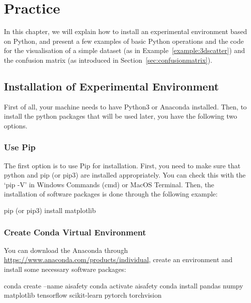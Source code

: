 \newpage 
\chapter{Practice}\label{sec:foundationspracticals}

In this chapter, we will explain how to install an experimental environment based on Python, and present a few examples of basic Python operations and the code for the visualisation of a simple dataset (as in Example~\ref{example:3dscatter}) and the confusion matrix (as introduced in Section~\ref{sec:confusionmatrix}). 

\section{Installation of Experimental Environment}

First of all, your machine needs to have Python3 or Anaconda installed. Then, to install the python packages that will be used later, you have the following two options. 
%

\subsection*{Use Pip} 
The first option is to use Pip for installation. 
First, you need to make sure that python and pip (or pip3) are installed appropriately. You can check this with the `pip -V' in Windows Commands (cmd) or MacOS Terminal. Then, the installation of software packages is done through the following example: 
\begin{cmds}
pip (or pip3) install matplotlib
\end{cmds}

\subsection*{Create Conda Virtual Environment}
You can download the Anaconda through  \url{https://www.anaconda.com/products/individual}, create an environment and install some necessary software packages: 

\begin{cmds}
conda create --name aisafety
conda activate aisafety
conda install pandas numpy matplotlib tensorflow scikit-learn pytorch torchvision
\end{cmds}


